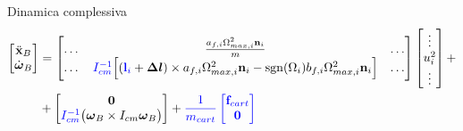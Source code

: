 \documentclass[]{beamer}
\DeclareMathOperator*{\sgn}{sgn}                %
\begin{document}
	\begin{frame}
		\centering
		\begin{columns}
			\begin{column}{.4\textwidth}
				\centering
				\begin{figure}
					
				\end{figure}					
			\end{column}
			\begin{column}{.4\textwidth}
				\centering
				\begin{figure}
					
				\end{figure}					
			\end{column}
		\end{columns}
		\begin{block}{Dinamica complessiva}
			\setlength\abovedisplayskip{0pt}
			\tiny
			\begin{equation*}
			\begin{split}
				\begin{bmatrix}
					\ddot{\mathbf{x}}_B \\
					\dot{\boldsymbol{\omega}}_B
				\end{bmatrix}
				&=
				\begin{bmatrix}
					\dots & \frac{a_{f,i}\Omega_{max,i}^2\mathbf{n}_i}{m} & \dots \\
					\dots & \textcolor{blue}{I_{cm}^{-1}}\Big[ (\textcolor{blue}{\mathbf{l}_i}+\boldsymbol{\Delta l})\times a_{f,i}\Omega^2_{max,i}\mathbf{n}_i-\sgn(\Omega_i)b_{f,i}\Omega_{max,i}^2\mathbf{n}_i\Big] & \dots
				\end{bmatrix}
				\begin{bmatrix}
					\vdots \\
					u_i^2 \\
					\vdots
				\end{bmatrix}
					+ \\
					&+
				\begin{bmatrix}
					\mathbf{0} \\
					\textcolor{blue}{I_{cm}^{-1}}\bigl(\boldsymbol{\omega}_B \times I_{cm} \boldsymbol{\omega}_B \bigl)
				\end{bmatrix}
				+
				\textcolor{blue}{
				\frac{1}{m_{cart}}
				\begin{bmatrix}
					\mathbf{f}_{cart} \\
					\mathbf{0}
				\end{bmatrix} 
				}
			\end{split}
			\end{equation*}
		\end{block}
	\end{frame}
\end{document}
